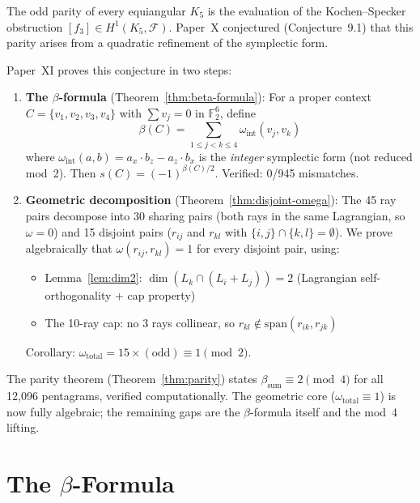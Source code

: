 \documentclass[11pt,a4paper]{article}
\theoremstyle{remark}
\newcommand{\F}{\mathbb{F}}
\newcommand{\cF}{\mathcal{F}}
\begin{document}
The odd parity of every equiangular $K_5$ is the evaluation of the
Kochen--Specker obstruction $[f_3] \in H^1(K_5, \cF)$. Paper~X
conjectured (Conjecture~9.1) that this parity arises from a quadratic
refinement of the symplectic form.

Paper~XI proves this conjecture in two steps:

\begin{enumerate}
\item \textbf{The $\beta$-formula} (Theorem~\ref{thm:beta-formula}):
  For a proper context $C = \{v_1, v_2, v_3, v_4\}$ with $\sum v_j = 0$
  in $\F_2^6$, define
  \[
  \beta(C) = \sum_{1 \leq j < k \leq 4} \omega_{\text{int}}(v_j, v_k)
  \]
  where $\omega_{\text{int}}(a, b) = a_x \cdot b_z - a_z \cdot b_x$ is
  the \emph{integer} symplectic form (not reduced mod~2). Then
  $s(C) = (-1)^{\beta(C)/2}$. Verified: 0/945 mismatches.

\item \textbf{Geometric decomposition} (Theorem~\ref{thm:disjoint-omega}):
  The 45 ray pairs decompose into 30 sharing pairs (both rays in the
  same Lagrangian, so $\omega = 0$) and 15 disjoint pairs
  ($r_{ij}$ and $r_{kl}$ with $\{i,j\} \cap \{k,l\} = \emptyset$).
  We prove algebraically that $\omega(r_{ij}, r_{kl}) = 1$ for every
  disjoint pair, using:
  \begin{itemize}
  \item Lemma~\ref{lem:dim2}: $\dim(L_k \cap (L_i + L_j)) = 2$
    (Lagrangian self-orthogonality + cap property)
  \item The 10-ray cap: no 3 rays collinear, so
    $r_{kl} \notin \text{span}(r_{ik}, r_{jk})$
  \end{itemize}
  Corollary: $\omega_{\text{total}} = 15 \times (\text{odd}) \equiv 1
  \pmod{2}$.
\end{enumerate}

The parity theorem (Theorem~\ref{thm:parity}) states
$\beta_{\text{sum}} \equiv 2 \pmod{4}$ for all 12{,}096 pentagrams,
verified computationally. The geometric core
($\omega_{\text{total}} \equiv 1$) is now fully algebraic; the
remaining gaps are the $\beta$-formula itself and the mod~4 lifting.

\section{\texorpdfstring{The $\beta$-Formula}{The beta-Formula}}
\label{sec:beta}
\end{document}
